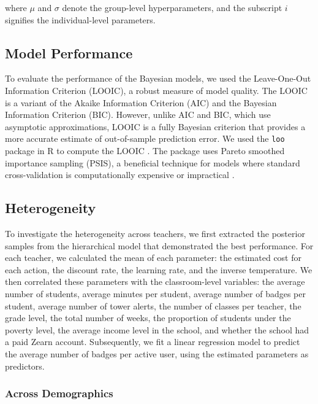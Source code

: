 \documentclass[
  number,
  preprint,
  3p,
  onecolumn]{elsarticle}
\begin{document}
where \(\mu\) and \(\sigma\) denote the group-level hyperparameters, and
the subscript \(i\) signifies the individual-level parameters.

\hypertarget{model-performance}{%
\subsection{Model Performance}\label{model-performance}}

To evaluate the performance of the Bayesian models, we used the
Leave-One-Out Information Criterion (LOOIC), a robust measure of model
quality. The LOOIC is a variant of the Akaike Information Criterion
(AIC) and the Bayesian Information Criterion (BIC). However, unlike AIC
and BIC, which use asymptotic approximations, LOOIC is a fully Bayesian
criterion that provides a more accurate estimate of out-of-sample
prediction error. We used the \texttt{loo} package in R to compute the
LOOIC \citep{vehtari2023}. The package uses Pareto smoothed importance
sampling (PSIS), a beneficial technique for models where standard
cross-validation is computationally expensive or impractical
\citep{vehtari2017}.

\hypertarget{heterogeneity}{%
\subsection{Heterogeneity}\label{heterogeneity}}

To investigate the heterogeneity across teachers, we first extracted the
posterior samples from the hierarchical model that demonstrated the best
performance. For each teacher, we calculated the mean of each parameter:
the estimated cost for each action, the discount rate, the learning
rate, and the inverse temperature. We then correlated these parameters
with the classroom-level variables: the average number of students,
average minutes per student, average number of badges per student,
average number of tower alerts, the number of classes per teacher, the
grade level, the total number of weeks, the proportion of students under
the poverty level, the average income level in the school, and whether
the school had a paid Zearn account. Subsequently, we fit a linear
regression model to predict the average number of badges per active
user, using the estimated parameters as predictors.

\hypertarget{across-demographics}{%
\subsubsection{Across Demographics}\label{across-demographics}}
\end{document}
